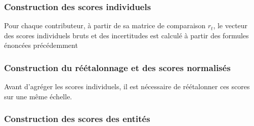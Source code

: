 \subsubsection{Construction des scores individuels}

Pour chaque contributeur, à partir de sa matrice de comparaison $r_t$, le vecteur des scores individuels bruts et des incertitudes est calculé à partir des formules énoncées précédemment

\subsubsection{Construction du réétalonnage et des scores normalisés}

Avant d'agréger les scores individuels, il est nécessaire de réétalonner ces scores sur une même échelle.

\subsubsection{Construction des scores des entités}

\pagebreak

